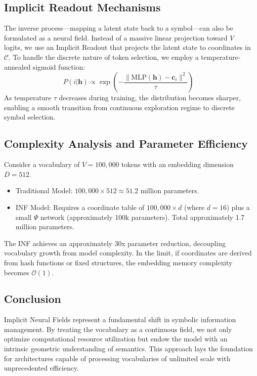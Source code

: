 \documentclass{article}
\numberwithin{equation}{section}
\begin{document}
\subsection{Implicit Readout Mechanisms}
The inverse process—mapping a latent state back to a symbol—can also be formulated as a neural field. Instead of a massive linear projection toward $V$ logits, we use an Implicit Readout that projects the latent state to coordinates in $\mathcal{C}$.
To handle the discrete nature of token selection, we employ a temperature-annealed sigmoid function:
\[
P(i | \mathbf{h}) \propto \exp\left( -\frac{\| \text{MLP}(\mathbf{h}) - \mathbf{c}_i \|^2}{\tau} \right)
\]
As temperature $\tau$ decreases during training, the distribution becomes sharper, enabling a smooth transition from continuous exploration regime to discrete symbol selection.

\subsection{Complexity Analysis and Parameter Efficiency}
Consider a vocabulary of $V = 100{,}000$ tokens with an embedding dimension $D = 512$.
\begin{itemize}
\item Traditional Model: $100{,}000 \times 512 \approx 51.2$ million parameters.
\item INF Model: Requires a coordinate table of $100{,}000 \times d$ (where $d=16$) plus a small $\Psi$ network (approximately 100k parameters). Total approximately 1.7 million parameters.
\end{itemize}
The INF achieves an approximately 30x parameter reduction, decoupling vocabulary growth from model complexity. In the limit, if coordinates are derived from hash functions or fixed structures, the embedding memory complexity becomes $\mathcal{O}(1)$.

\subsection{Conclusion}
Implicit Neural Fields represent a fundamental shift in symbolic information management. By treating the vocabulary as a continuous field, we not only optimize computational resource utilization but endow the model with an intrinsic geometric understanding of semantics. This approach lays the foundation for architectures capable of processing vocabularies of unlimited scale with unprecedented efficiency.
\end{document}
